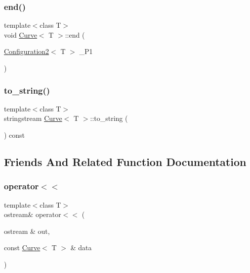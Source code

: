 \mbox{\label{class_curve_a5b11ffc442dcdca2def5d09ad4fbb424}} 
\subsubsection{\texorpdfstring{end()}{end()}\hspace{0.1cm}{\footnotesize\ttfamily [2/2]}}
{\footnotesize\ttfamily template$<$class T$>$ \\
void \mbox{\hyperlink{class_curve}{Curve}}$<$ T $>$\+::end (\begin{DoxyParamCaption}\item[{\mbox{\hyperlink{class_configuration2}{Configuration2}}$<$ T $>$}]{\+\_\+\+P1 }\end{DoxyParamCaption})\hspace{0.3cm}{\ttfamily [inline]}}

\mbox{\label{class_curve_a92e5b3a7445040e0e1e8a96707c5e6c2}} 
\subsubsection{\texorpdfstring{to\_string()}{to\_string()}}
{\footnotesize\ttfamily template$<$class T$>$ \\
stringstream \mbox{\hyperlink{class_curve}{Curve}}$<$ T $>$\+::to\+\_\+string (\begin{DoxyParamCaption}{ }\end{DoxyParamCaption}) const\hspace{0.3cm}{\ttfamily [inline]}}



\subsection{Friends And Related Function Documentation}
\mbox{\label{class_curve_a91af4d37d8aec484114b20623c07058b}} 
\subsubsection{\texorpdfstring{operator$<$$<$}{operator<<}}
{\footnotesize\ttfamily template$<$class T$>$ \\
ostream\& operator$<$$<$ (\begin{DoxyParamCaption}\item[{ostream \&}]{out,  }\item[{const \mbox{\hyperlink{class_curve}{Curve}}$<$ T $>$ \&}]{data }\end{DoxyParamCaption})\hspace{0.3cm}{\ttfamily [friend]}}



